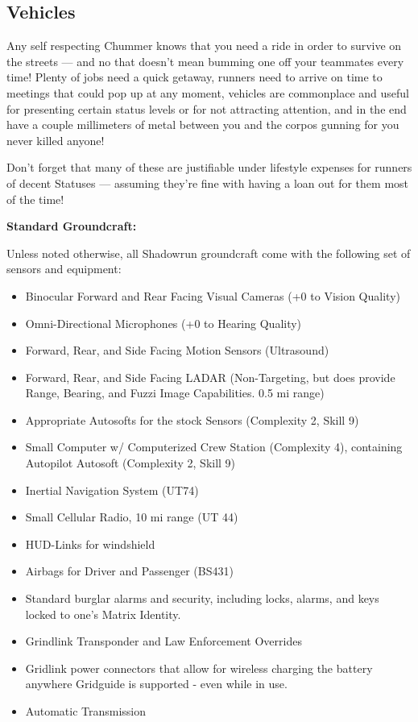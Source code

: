 \subsection{Vehicles}

Any self respecting Chummer knows that you need a ride in order to survive on the streets — and no that doesn't mean bumming one off your teammates every time! Plenty of jobs need a quick getaway, runners need to arrive on time to meetings that could pop up at any moment, vehicles are commonplace and useful for presenting certain status levels or for not attracting attention, and in the end have a couple millimeters of metal between you and the corpos gunning for you never killed anyone!

Don't forget that many of these are justifiable under lifestyle expenses for runners of decent Statuses — assuming they're fine with having a loan out for them most of the time!

\textbf{Standard Groundcraft:}

Unless noted otherwise, all Shadowrun groundcraft come with the following set of sensors and equipment:
\begin{itemize}
	\itemsep 0pt
	\item Binocular Forward and Rear Facing Visual Cameras (+0 to Vision Quality)
	\item Omni-Directional Microphones (+0 to Hearing Quality)
	\item Forward, Rear, and Side Facing Motion Sensors (Ultrasound)
	\item Forward, Rear, and Side Facing LADAR (Non-Targeting, but does provide Range, Bearing, and Fuzzi Image Capabilities. 0.5 mi range)
	\item Appropriate Autosofts for the stock Sensors (Complexity 2, Skill 9)
	\item Small Computer w/ Computerized Crew Station (Complexity 4), containing Autopilot Autosoft (Complexity 2, Skill 9)
	\item Inertial Navigation System (UT74) 
	\item Small Cellular Radio, 10 mi range (UT 44)
	\item HUD-Links for windshield
	\item Airbags for Driver and Passenger (BS431)
	\item Standard burglar alarms and security, including locks, alarms, and keys locked to one's Matrix Identity.
	\item Grindlink Transponder and Law Enforcement Overrides
	\item Gridlink power connectors that allow for wireless charging the battery anywhere Gridguide is supported - even while in use.
	\item Automatic Transmission
\end{itemize}


